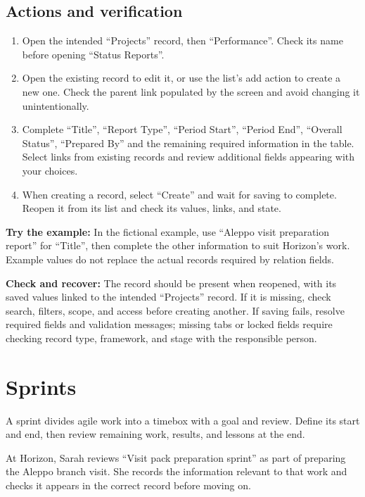 \subsection{Actions and verification}
\begin{enumerate}
\item Open the intended “Projects” record, then “Performance”. Check its name before opening “Status Reports”.
\item Open the existing record to edit it, or use the list's add action to create a new one. Check the parent link populated by the screen and avoid changing it unintentionally.
\item Complete “Title”, “Report Type”, “Period Start”, “Period End”, “Overall Status”, “Prepared By” and the remaining required information in the table. Select links from existing records and review additional fields appearing with your choices.
\item When creating a record, select “Create” and wait for saving to complete. Reopen it from its list and check its values, links, and state.
\end{enumerate}

\textbf{Try the example:} In the fictional example, use “Aleppo visit preparation report” for “Title”, then complete the other information to suit Horizon's work. Example values do not replace the actual records required by relation fields.

\textbf{Check and recover:} The record should be present when reopened, with its saved values linked to the intended “Projects” record. If it is missing, check search, filters, scope, and access before creating another. If saving fails, resolve required fields and validation messages; missing tabs or locked fields require checking record type, framework, and stage with the responsible person.

\clearpage
\section{Sprints}
\label{sec:projects-feature-sprints}

A sprint divides agile work into a timebox with a goal and review. Define its start and end, then review remaining work, results, and lessons at the end.

\begin{rcnote}
At Horizon, Sarah reviews “Visit pack preparation sprint” as part of preparing the Aleppo branch visit. She records the information relevant to that work and checks it appears in the correct record before moving on.
\end{rcnote}

